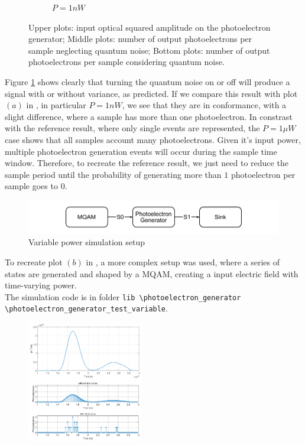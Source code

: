 \begin{refsection}
\begin{figure}[H]
\begin{subfigure}{0.45\textwidth}
		\caption{$P=1 nW$}
	\end{subfigure}
	\caption{Upper plots: input optical squared amplitude on the photoelectron generator; Middle plots: number of output photoelectrons per sample neglecting quantum noise; Bottom plots: number of output photoelectrons per sample considering quantum noise.}
	\label{plot:quantum_noise_sim_constant}
\end{figure}
%
Figure \ref{plot:quantum_noise_sim_constant} shows clearly that turning the quantum noise on or off will produce a signal with or without variance, as predicted.
If we compare this result with plot $(a)$ in \cite{saleh1991}, in particular $P=1nW$, we see that they are in conformance, with a slight difference, where a sample has more than one photoelectron.
In constrast with the reference result, where only single events are represented, the $P=1 \mu W$ case shows that all samples account many photoelectrons.
Given it's input power, multiple photoelectron generation events will occur during the sample time window.
Therefore, to recreate the reference result, we just need to reduce the sample period until the probability of generating more than $1$ photoelectron per sample goes to $0$.
\\
%
\begin{figure}[H]
	\centering
	\includegraphics{./lib/photoelectron_generator/figures/scheme_simulation_variable.pdf}
	\caption{Variable power simulation setup}
\end{figure}
%
To recreate plot $(b)$ in \cite{saleh1991}, a more complex setup was used, where a series of states are generated and shaped by a MQAM, creating a input electric field with time-varying power.\\
The simulation code is in folder \texttt{lib \textbackslash photoelectron\_generator \textbackslash photoelectron\_generator\_test\_variable}.
%
\begin{figure}[H]
	\centering
	\includegraphics[width=0.45\textwidth]{./lib/photoelectron_generator/figures/plot-variable}

\end{figure}
\end{refsection}
